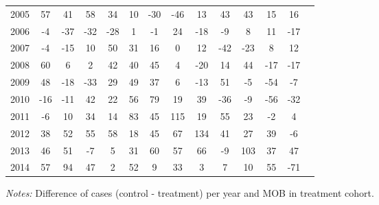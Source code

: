 \begin{table}[H]
\begin{threeparttable}
{\begin{tabular}{l*{13}{c}}
2005        &          57&          41&          58&          34&          10&         -30&         -46&          13&          43&          43&          15&          16\\
2006        &          -4&         -37&         -32&         -28&           1&          -1&          24&         -18&          -9&           8&          11&         -17\\
2007        &          -4&         -15&          10&          50&          31&          16&           0&          12&         -42&         -23&           8&          12\\
2008        &          60&           6&           2&          42&          40&          45&           4&         -20&          14&          44&         -17&         -17\\
2009        &          48&         -18&         -33&          29&          49&          37&           6&         -13&          51&          -5&         -54&          -7\\
2010        &         -16&         -11&          42&          22&          56&          79&          19&          39&         -36&          -9&         -56&         -32\\
2011        &          -6&          10&          34&          14&          83&          45&         115&          19&          55&          23&          -2&           4\\
2012        &          38&          52&          55&          58&          18&          45&          67&         134&          41&          27&          39&          -6\\
2013        &          46&          51&          -7&           5&          31&          60&          57&          66&          -9&         103&          37&          47\\
2014        &          57&          94&          47&           2&          52&           9&          33&           3&           7&          10&          55&         -71\\
 \bottomrule \end{tabular} } \begin{tablenotes} \item \scriptsize \emph{Notes:} Difference of cases (control - treatment) per year and MOB in treatment cohort. \end{tablenotes} \end{threeparttable} \end{table} 

